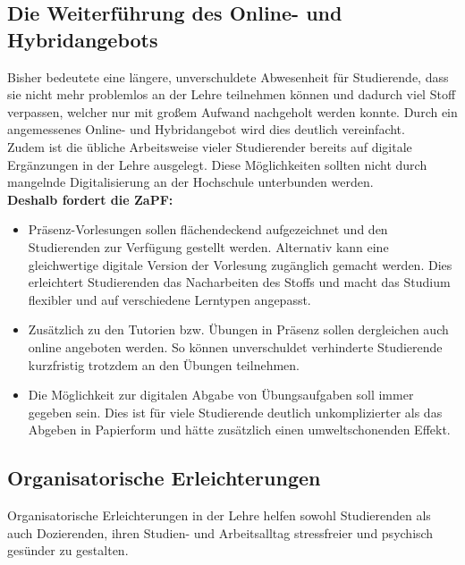 \documentclass[DIV=calc]{scrartcl}
\begin{document}

\subsection*{Die Weiterführung des Online- und Hybridangebots}

Bisher bedeutete eine längere, unverschuldete Abwesenheit für Studierende, dass sie nicht mehr problemlos an der Lehre teilnehmen können und dadurch viel Stoff 
verpassen, welcher nur mit großem Aufwand nachgeholt werden konnte. Durch ein angemessenes Online- und Hybridangebot wird dies deutlich vereinfacht.\\Zudem ist die übliche Arbeitsweise vieler Studierender bereits auf digitale Ergänzungen in der Lehre ausgelegt. Diese Möglichkeiten sollten nicht durch mangelnde Digitalisierung an der Hochschule unterbunden werden. \\

\textbf{Deshalb fordert die ZaPF:}

\begin{itemize}
\item Präsenz-Vorlesungen sollen flächendeckend aufgezeichnet und den Studierenden zur Verfügung gestellt werden. Alternativ kann eine gleichwertige digitale Version der Vorlesung zugänglich gemacht werden.
Dies erleichtert Studierenden das Nacharbeiten des Stoffs und macht das Studium flexibler und auf verschiedene Lerntypen angepasst. 
\item Zusätzlich zu den Tutorien bzw. Übungen in Präsenz sollen dergleichen auch online angeboten werden. So können unverschuldet verhinderte Studierende kurzfristig trotzdem an den Übungen teilnehmen.
\item Die Möglichkeit zur digitalen Abgabe von Übungsaufgaben soll immer gegeben sein. Dies ist für viele Studierende deutlich unkomplizierter als das Abgeben in Papierform und hätte zusätzlich einen umweltschonenden Effekt.
\end{itemize}

\subsection*{Organisatorische Erleichterungen}
Organisatorische Erleichterungen in der Lehre helfen sowohl Studierenden als auch Dozierenden, ihren Studien- und Arbeitsalltag stressfreier und psychisch gesünder zu gestalten.\\
\end{document}
